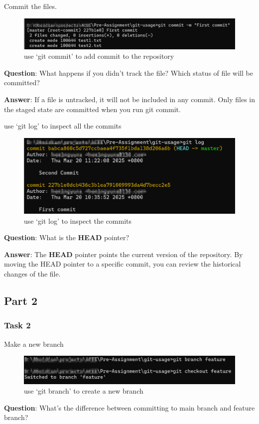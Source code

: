 Commit the files.
\begin{figure}[H]
\centering
\includegraphics[width = \textwidth]{./figures/commit.png}
\caption{use `git commit' to add commit to the repository}
\end{figure}
\textbf{Question}: What happens if you didn't track the file? Which status of file will be committed?

\textbf{Answer}: If a file is untracked, it will not be included in any commit. Only files in the staged state are committed when you run git commit.

use `git log' to inspect all the commits
\begin{figure}[H]
\centering
\includegraphics[width = \textwidth]{./figures/log.png}
\caption{use `git log' to inspect the commits}
\end{figure}

\textbf{Question}:  What is the \textbf{HEAD} pointer?

\textbf{Answer}: The \textbf{HEAD} pointer points the current version of the repository. By moving the HEAD pointer to a specific commit, you can review the historical changes of the file.

\subsection{Part 2}
\subsubsection{Task 2}
Make a new branch
\begin{figure}[H]
\centering
\includegraphics[width = \textwidth]{./figures/new_branch.png}
\caption{use `git branch' to create a new branch}
\end{figure}
\textbf{Question}: What's the difference between committing to main branch and feature branch?

